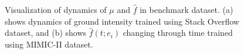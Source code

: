 \begin{figure}[p] \ContinuedFloat
    \vspace{-10cm}
    \hfill
    \caption{Visualization of dynamics of $\mu$ and $\hat{f}$ in benchmark dataset. (a) shows dynamics of ground intensity trained using Stack Overflow dataset, and (b) shows $\hat{f}(t; e_i)$ changing through time trained using MIMIC-II dataset.}
    \label{fig:mooc}
\end{figure}
\clearpage

